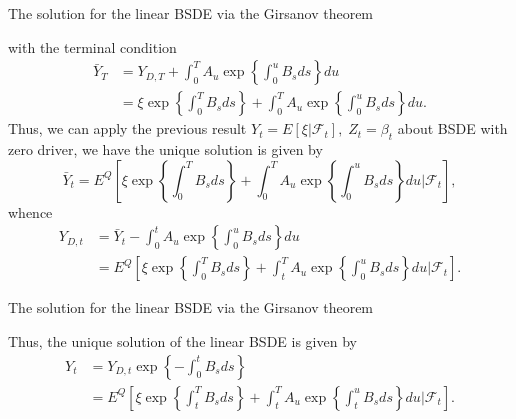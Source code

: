\documentclass{beamer}
\begin{document}
\begin{frame}{The solution for the linear BSDE via the Girsanov theorem}

    {\footnotesize \footnotesize
    with the terminal condition
    \begin{align*}
        \bar{Y}_T &= Y_{D,T} + \int_0^T A_u \exp \left\{ \int_0^u B_s ds \right\} du\\
        &= \xi \exp \left\{ \int_0^T B_s ds \right\} + \int_0^T A_u 
\exp \left\{ \int_0^u B_s ds \right\} du.
    \end{align*}
    Thus, we can apply the previous result 
    $Y_t = E[\xi|\mathcal{F}_t], \;Z_t = \beta_t$ about BSDE with zero driver, we have the unique solution is given by
\[
\bar{Y}_t = E^Q \left[ \xi \exp \left\{ \int_0^T B_s ds \right\} + \int_0^T A_u \exp \left\{ \int_0^u B_s ds \right\} du | \mathcal{F}_t \right],
\]
whence
\begin{align*}
    Y_{D,t} &= \bar{Y}_t - \int_0^t A_u \exp \left\{ \int_0^u B_s ds \right\} du\\
    &= E^Q \left[ \xi \exp \left\{ \int_0^T B_s ds \right\} +
 \int_t^T A_u \exp \left\{ \int_0^u B_s ds \right\} du | \mathcal{F}_t \right].
\end{align*}
    }
    
\end{frame}

\begin{frame}{The solution for the linear BSDE via the Girsanov theorem}

    {\footnotesize \footnotesize
     Thus, the unique solution of the linear BSDE is given by
     \begin{align*}
        Y_t &= Y_{D,t} \exp \left\{ -\int_0^t B_s ds \right\}\\
        &= E^Q \left[ \xi \exp \left\{ \int_t^T B_s ds \right\} 
+ \int_t^T A_u \exp \left\{ \int_t^u B_s ds \right\} du |\mathcal{F}_t \right].
     \end{align*}

    }
    
\end{frame}




    
\end{document}
